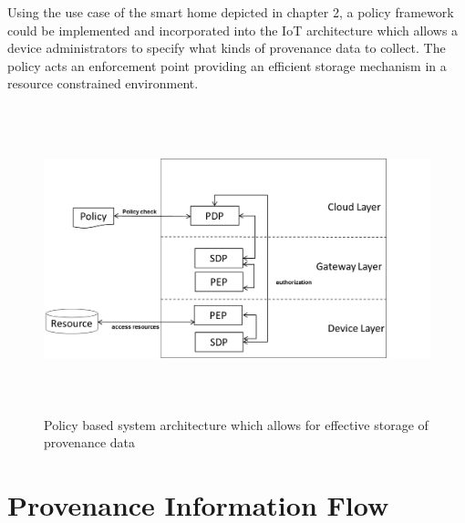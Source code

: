 
\par Using the use case of the smart home depicted in chapter 2, a policy framework could be implemented and incorporated into the IoT architecture which allows a device administrators to specify what kinds of provenance data to collect. The policy acts an enforcement point providing an efficient storage mechanism in a resource constrained environment. 


\begin{figure}[ht!]
\begin{center}
\includegraphics[height=3.5in]{policy.png}
\caption{Policy based system architecture which allows for effective storage of provenance data}
\label{policy_architecture}
\end{center}
\end{figure}

\section{Provenance Information Flow}

